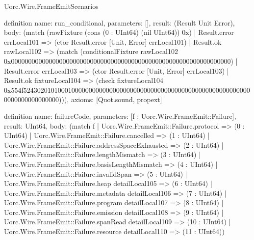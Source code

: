 \begin{lexlean}{Uorc.Wire.FrameEmitScenarios}
\begin{semanticmodule}
definition{
  name: run_conditional,
  parameters: [],
  result: (Result Unit Error),
  body: (match (rawFixture (cons (0 : UInt64) (nil UInt64)) 0x)
    | Result.error errLocal101 => (ctor Result.error [Unit, Error] errLocal101)
    | Result.ok rawLocal102 => (match (conditionalFixture rawLocal102 0x0000000000000000000000000000000000000000000000000000000000000000)
      | Result.error errLocal103 => (ctor Result.error [Unit, Error] errLocal103)
      | Result.ok fixtureLocal104 => (check fixtureLocal104 0x554f5243020101000100000000000000000000000000000000000000000000000000000000000000000000))),
  axioms: [Quot.sound, propext]
}

definition{
  name: failureCode,
  parameters: [f : Uorc.Wire.FrameEmit::Failure],
  result: UInt64,
  body: (match f
    | Uorc.Wire.FrameEmit::Failure.protocol => (0 : UInt64)
    | Uorc.Wire.FrameEmit::Failure.cancelled => (1 : UInt64)
    | Uorc.Wire.FrameEmit::Failure.addressSpaceExhausted => (2 : UInt64)
    | Uorc.Wire.FrameEmit::Failure.lengthMismatch => (3 : UInt64)
    | Uorc.Wire.FrameEmit::Failure.basisLengthMismatch => (4 : UInt64)
    | Uorc.Wire.FrameEmit::Failure.invalidSpan => (5 : UInt64)
    | Uorc.Wire.FrameEmit::Failure.heap detailLocal105 => (6 : UInt64)
    | Uorc.Wire.FrameEmit::Failure.metadata detailLocal106 => (7 : UInt64)
    | Uorc.Wire.FrameEmit::Failure.program detailLocal107 => (8 : UInt64)
    | Uorc.Wire.FrameEmit::Failure.emission detailLocal108 => (9 : UInt64)
    | Uorc.Wire.FrameEmit::Failure.spanRead detailLocal109 => (10 : UInt64)
    | Uorc.Wire.FrameEmit::Failure.resource detailLocal110 => (11 : UInt64))
}


\end{semanticmodule}
\end{lexlean}
